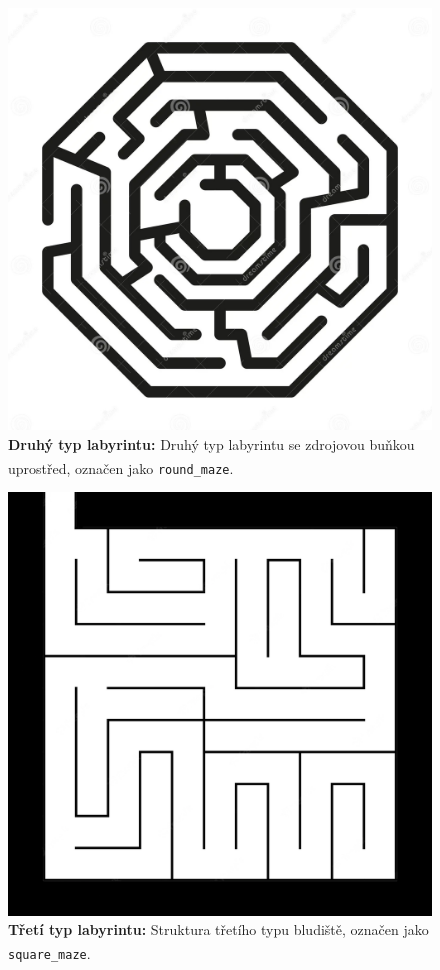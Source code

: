 \documentclass[10pt,a4paper,twocolumn]{article}
\begin{document}
\begin{figure}[tb]
  \centering
  \includegraphics[width=0.98\linewidth]{images/round_maze.png}
  \caption{\textbf{Druhý typ labyrintu:} 
  Druhý typ labyrintu se zdrojovou buňkou uprostřed, označen jako \texttt{round\_maze}\textsuperscript{\cite{round_maze}}.}
  \label{fig:round_maze}
\end{figure} 

\begin{figure}[tb]
  \centering
  \includegraphics[width=0.98\linewidth]{images/square_maze.png}
  \caption{\textbf{Třetí typ labyrintu:} 
  Struktura třetího typu bludiště, označen jako \texttt{square\_maze}\textsuperscript{\cite{square_maze}}.}
  \label{fig:square_maze}
\end{figure} 
\end{document}
